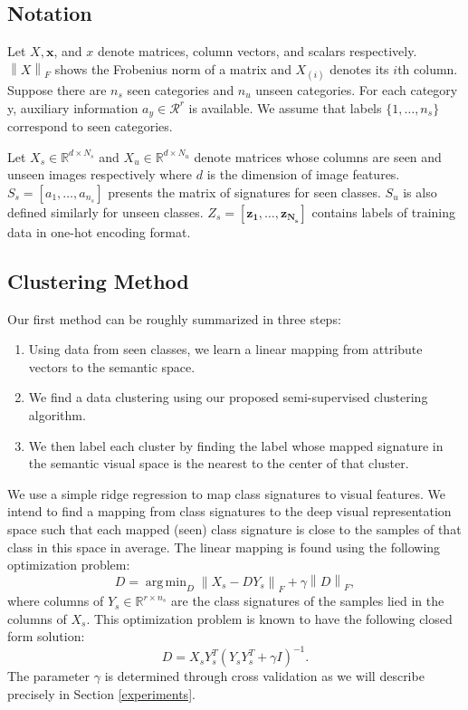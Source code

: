 \documentclass[10pt,twocolumn,letterpaper]{article}
\newcommand{\norm}[1]{\left \lVert #1 \right \rVert_{F}}
\DeclareMathOperator*{\argmin}{arg\,min}
\begin{document}
\subsection{Notation}
Let $X, \mathbf{x}$, and $x$ denote matrices, column vectors, and scalars respectively. $\norm{X}$ shows the Frobenius norm of a matrix and
$X_{(i)}$ denotes its $i$th column.
Suppose there are $n_s$ seen categories and $n_u$ unseen categories. For each category y,
auxiliary information $a_y \in \mathcal{R}^r$ is available. We assume that labels $\{1, \ldots, n_s \}$ correspond to seen categories.

Let $X_s \in \mathbb{R}^{d \times N_s}$ and $X_u \in \mathbb{R}^{d \times N_u}$
denote matrices whose columns are seen and unseen images respectively where $d$ is the dimension of image features.
$S_s = [a_1, \ldots, a_{n_s}]$ presents the matrix of signatures for seen classes. $S_u$ is also defined similarly for unseen classes.
$Z_s = [ \mathbf{z_1}, \ldots, \mathbf{z_{N_s}} ]$
contains labels of training data in one-hot encoding format.

\subsection{Clustering Method} \label{clustering}
Our first method can be roughly summarized in three steps:
\begin{enumerate}
  \item Using data from seen classes, we learn a linear mapping from attribute vectors to the semantic space.
  \item We find a data clustering using our proposed semi-supervised clustering algorithm.
  \item We then label each cluster by finding the label whose mapped signature in the semantic visual space is the nearest to the center of that cluster.
\end{enumerate}

We use a simple ridge regression to map class signatures to visual features. We intend to find a mapping from class signatures to the deep visual representation space such that each mapped (seen) class signature is close to the samples of that class in this space in average.
The linear mapping is found using the following optimization problem:
\begin{equation} \label{eq:mapping}
  D = \argmin_D \norm{X_s - D Y_s} + \gamma \norm{D},
\end{equation}
where columns of $ Y_s \in \mathbb{R}^{r \times n_s} $ are the class signatures of the samples lied in the columns of $X_s$.
This optimization problem is known to have the following closed form solution:
\begin{equation} \label{eq:dic}
  D = X_s Y_s^T (Y_s Y_s^T + \gamma I)^{-1}.
\end{equation}
The parameter $\gamma$ is determined through cross validation as we will describe precisely in Section \ref{experiments}.
\end{document}
